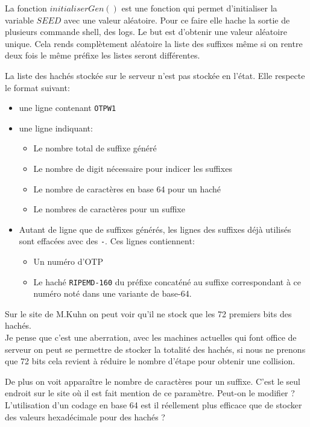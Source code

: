 \documentclass{../res/univ-projet}
\begin{document}
    La fonction $initialiserGen()$ est une fonction qui permet d'initialiser
    la variable $SEED$ avec une valeur aléatoire. Pour ce faire elle hache la sortie
    de plusieurs commande shell, des logs. Le but est d'obtenir une valeur aléatoire
    unique. Cela rends complètement aléatoire la liste des suffixes même si on rentre
    deux fois le même préfixe les listes seront différentes.

    La liste des hachés stockée sur le serveur n'est pas stockée en l'état. Elle respecte
    le format suivant:
    \begin{itemize}
        \item une ligne contenant \verb?OTPW1?
        \item une ligne indiquant:
            \begin{itemize}
                \item Le nombre total de suffixe généré
                \item Le nombre de digit nécessaire pour indicer les suffixes
                \item Le nombre de caractères en base 64 pour un haché
                \item Le nombres de caractères pour un suffixe
            \end{itemize}
        \item Autant de ligne que de suffixes générés, les lignes des
            suffixes déjà utilisés sont effacées avec des \verb?-?.
            Ces lignes contiennent:
            \begin{itemize}
                \item Un numéro d'OTP
                \item Le haché \verb?RIPEMD-160? du préfixe concaténé
                    au suffixe correspondant à ce numéro noté dans une variante de base-64.
            \end{itemize}
    \end{itemize}
    Sur le site de M.Kuhn on peut voir qu'il ne stock que les 72 premiers bits des hachés.\\
    Je pense que c'est une aberration, avec les machines actuelles qui font office de serveur
    on peut se permettre de stocker la totalité des hachés, si nous ne prenons que 72 bits
    cela revient à réduire le nombre d'étape pour obtenir une collision.
    
    De plus on voit apparaître le nombre de caractères pour un suffixe. C'est le seul endroit
    sur le site où il est fait mention de ce paramètre. Peut-on le modifier ?\\
    L'utilisation d'un codage en base 64 est il réellement plus efficace que de stocker
    des valeurs hexadécimale pour des hachés ?
\end{document}
